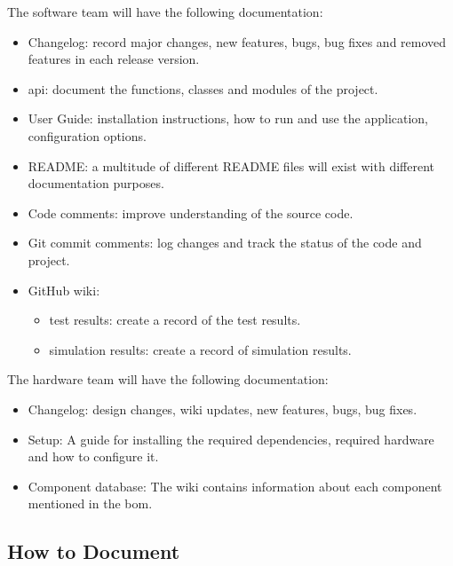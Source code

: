 The software team will have the following documentation:
\begin{itemize}
    \item Changelog: record major changes, new features, bugs, bug fixes and removed features in each release version.
    \item \acs{api}: document the functions, classes and modules of the project.
    \item User Guide: installation instructions, how to run and use the application, configuration options.
    \item README: a multitude of different README files will exist with different documentation purposes.
    \item Code comments: improve understanding of the source code.
    \item Git commit comments: log changes and track the status of the code and project.
    \item GitHub wiki: 
    \begin{itemize}
        \item test results: create a record of the test results.
        \item simulation results: create a record of simulation results.
    \end{itemize}
\end{itemize}

The hardware team will have the following documentation:
\begin{itemize}
    \item Changelog: design changes, wiki updates, new features, bugs, bug fixes.
    \item Setup: A guide for installing the required dependencies, required hardware and how to configure it.
    \item Component database: The wiki contains information about each component mentioned in the \ac{bom}.
\end{itemize}



\subsection{How to Document}

